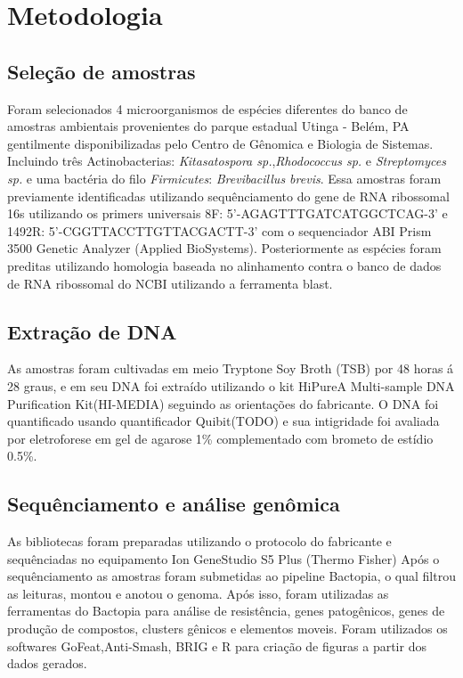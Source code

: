 \chapter{Metodologia}
\section{Seleção de amostras}
Foram selecionados 4 microorganismos de espécies diferentes do banco de amostras ambientais provenientes
do parque estadual Utinga - Belém, PA gentilmente disponibilizadas pelo Centro de Gênomica e Biologia de Sistemas.
Incluindo três Actinobacterias: \textit{Kitasatospora sp.},\textit{Rhodococcus sp.} e \textit{Streptomyces sp.}
e uma bactéria do filo \textit{Firmicutes}: \textit{Brevibacillus brevis}.
Essa amostras foram previamente identificadas utilizando sequênciamento do gene de RNA ribossomal 16s
utilizando os primers universais 8F: 5'-AGAGTTTGATCATGGCTCAG-3' e 1492R: 5'-CGGTTACCTTGTTACGACTT-3' com o sequenciador 
ABI Prism 3500 Genetic Analyzer (Applied BioSystems). Posteriormente as espécies foram preditas utilizando
homologia baseada no alinhamento contra o banco de dados de RNA ribossomal do NCBI utilizando a ferramenta
blast.

\section{Extração de DNA}
As amostras foram cultivadas em meio Tryptone Soy Broth (TSB) por 48 horas á 28 graus, e em
seu DNA foi extraído utilizando o kit HiPureA Multi-sample DNA Purification Kit(HI-MEDIA) seguindo as orientações
do fabricante. O DNA foi quantificado usando quantificador Quibit(TODO) e sua intigridade foi 
avaliada por eletroforese em gel de agarose 1\% complementado com brometo de estídio 0.5\%.

\section{Sequênciamento e análise genômica}
As bibliotecas foram preparadas utilizando o protocolo do fabricante e sequênciadas no equipamento
Ion GeneStudio S5 Plus (Thermo Fisher)
Após o sequênciamento as amostras foram submetidas ao pipeline Bactopia, o qual filtrou
as leituras, montou e anotou o genoma. Após isso, foram utilizadas as ferramentas do Bactopia 
para análise de resistência, genes patogênicos, genes de produção de compostos, clusters
gênicos e elementos moveis. 
Foram utilizados os softwares GoFeat,Anti-Smash, BRIG e R para criação de figuras a partir dos dados gerados.
